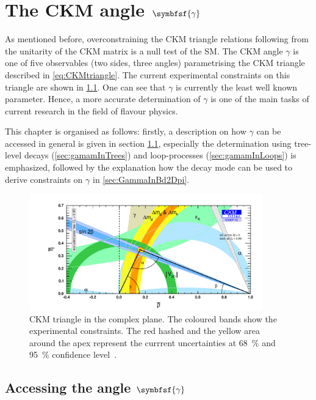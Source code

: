 \chapter[head={The CKM angle $\gamma$},tocentry={The CKM angle $\symbfsf{\gamma}$}]{The CKM angle $\symbfsf{\gamma}$}
\label{ch:CKMAngleGamma}

\linespread{1.08}\selectfont
As mentioned before, overconstraining the CKM triangle relations following from the unitarity of the CKM matrix is a null test of the \ac{SM}.
The CKM angle $\gamma$ is one of five observables (two sides, three angles) parametrising the CKM triangle described in \cref{eq:CKMtriangle}.
The current experimental constraints on this triangle are shown in \cref{fig:ckmtriangle}.
One can see that $\gamma$ is currently the least well known parameter.
Hence, a more accurate determination of $\gamma$ is one of the main tasks of current research in the field of flavour physics.

This chapter is organised as follows: firstly, a description on how $\gamma$ can be accessed in general is given in section \cref{sec:accessGamma}, especially the determination using tree-level decays (\cref{sec:gamamInTrees}) and loop-processes (\cref{sec:gamamInLoops}) is emphasized, followed by the explanation how the decay mode \BdToDpi can be used to derive constraints on $\gamma$ in \cref{sec:GammaInBd2Dpi}.

\begin{figure}[tbp]
	\centering
	\includegraphics[width=0.9\textwidth]{04gamma/figs/CKMTriangle.pdf}
	\caption{CKM triangle in the complex plane.
	The coloured bands show the experimental constraints.
	The red hashed and the yellow area around the apex represent the currrent uncertainties at \SI{68}{\percent} and \SI{95}{\percent} confidence level~\cite{CKMfitter2015}.}
	\label{fig:ckmtriangle}
\end{figure}

\section[head={Accessing the angle $\gamma$},tocentry={Accessing the angle $\gamma$}]{Accessing the angle $\symbfsf{\gamma}$}
\label{sec:accessGamma}


